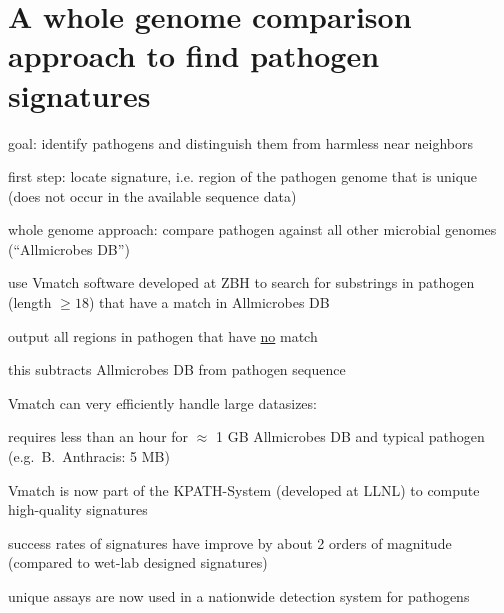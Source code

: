 \documentclass[12pt]{article}
\begin{document}
\parindent0pt
\parskip10pt

\section*{A whole genome comparison approach to find pathogen signatures}

goal: identify pathogens and distinguish them from harmless near neighbors

first step: locate signature, i.e. region of the pathogen genome that is
unique (does not occur in the available sequence data)

whole genome approach: compare pathogen against all other microbial genomes 
(``Allmicrobes DB'')

use Vmatch software developed at ZBH to 
search for substrings in pathogen (length \(\geq 18\)) that
have a match in Allmicrobes DB

output all regions in pathogen that have \underline{no} match

this subtracts Allmicrobes DB from pathogen sequence

Vmatch can very efficiently handle large datasizes:

requires less than an hour for \(\approx\) 1 GB Allmicrobes DB and typical 
pathogen (e.g.\ B.\ Anthracis: 5 MB)

Vmatch is now part of the KPATH-System (developed at LLNL)
to compute high-quality signatures

success rates of signatures have improve by about 2 orders of magnitude 
(compared to wet-lab designed signatures)

unique assays are now used in a nationwide detection system for pathogens
\end{document}
